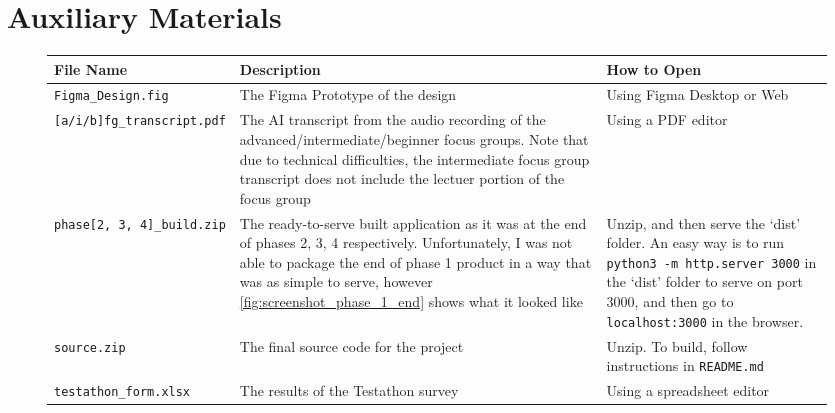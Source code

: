 \chapter{Auxiliary Materials}
\label{appx:additional_mats}
\begin{figure}[h]
    \centering
    \begin{tabular}{|m{5cm}|p{5cm}|>{\raggedright\arraybackslash}p{5.5cm}|}
        \hline\textbf{File Name} & \textbf{Description} & \textbf{How to Open} \\[1ex] \hline\vspace{1ex}
        \verb|Figma_Design.fig| & The Figma Prototype of the design & Using Figma Desktop or Web\\[1ex] \hline\vspace{1ex}

        \verb|[a/i/b]fg_transcript.pdf| & The AI transcript from the audio recording of the advanced/intermediate/beginner focus groups. Note that due to technical difficulties, the intermediate focus group transcript does not include the lectuer portion of the focus group & Using a PDF editor \\[1ex] \hline\vspace{1ex}

        \verb|phase[2, 3, 4]_build.zip| & The ready-to-serve built application as it was at the end of phases 2, 3, 4 respectively. Unfortunately, I was not able to package the end of phase 1 product in a way that was as simple to serve, however \ref{fig:screenshot_phase_1_end} shows what it looked like & Unzip, and then serve the `dist' folder. An easy way is to run \verb|python3 -m http.server 3000| in the `dist' folder to serve on port 3000, and then go to \verb|localhost:3000| in the browser. \\[1ex]\hline\vspace{1ex}

        \verb|source.zip| & The final source code for the project & Unzip. To build, follow instructions in \verb|README.md| \\[1ex] \hline\vspace{1ex}

        \verb|testathon_form.xlsx| & The results of the Testathon survey & Using a spreadsheet editor \\ \hline
    \end{tabular}
\end{figure}

